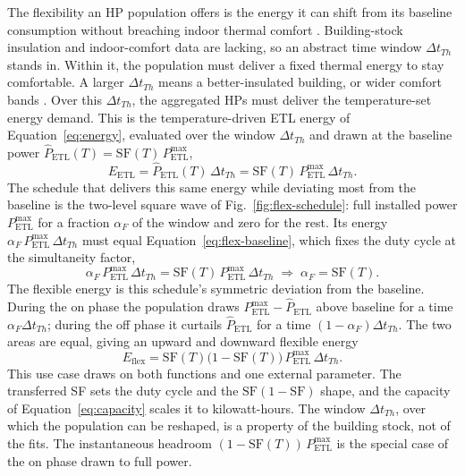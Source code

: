 \documentclass[9pt,journal,a4]{IEEEtran}
\begin{document}
The flexibility an HP population offers is the energy it can shift from its baseline consumption without breaching indoor thermal comfort \cite{Zir19}. Building-stock insulation and indoor-comfort data are lacking, so an abstract time window $\Delta t_{Th}$ stands in. Within it, the population must deliver a fixed thermal energy to stay comfortable. A larger $\Delta t_{Th}$ means a better-insulated building, or wider comfort bands \cite{Cha16}.
Over this $\Delta t_{Th}$, the aggregated HPs must deliver the temperature-set energy demand. This is the temperature-driven ETL energy of Equation~\eqref{eq:energy}, evaluated over the window $\Delta t_{Th}$ and drawn at the baseline power $\hat{P}_{\mathrm{ETL}}(T) = \mathrm{SF}(T)\,P_{\mathrm{ETL}}^{\max}$,
\begin{equation}
E_{\mathrm{ETL}} = \hat{P}_{\mathrm{ETL}}(T)\,\Delta t_{Th} = \mathrm{SF}(T)\,P_{\mathrm{ETL}}^{\max}\,\Delta t_{Th}.
\label{eq:flex-baseline}
\end{equation}
The schedule that delivers this same energy while deviating most from the baseline is the two-level square wave of Fig.~\ref{fig:flex-schedule}: full installed power $P_{\mathrm{ETL}}^{\max}$ for a fraction $\alpha_F$ of the window and zero for the rest. Its energy $\alpha_F\,P_{\mathrm{ETL}}^{\max}\,\Delta t_{Th}$ must equal Equation~\eqref{eq:flex-baseline}, which fixes the duty cycle at the simultaneity factor,
\begin{equation}
\alpha_F\,P_{\mathrm{ETL}}^{\max}\,\Delta t_{Th} = \mathrm{SF}(T)\,P_{\mathrm{ETL}}^{\max}\,\Delta t_{Th} \;\Longrightarrow\; \alpha_F = \mathrm{SF}(T).
\label{eq:flex-duty}
\end{equation}
The flexible energy is this schedule's symmetric deviation from the baseline. During the on phase the population draws $P_{\mathrm{ETL}}^{\max} - \hat{P}_{\mathrm{ETL}}$ above baseline for a time $\alpha_F \Delta t_{Th}$; during the off phase it curtails $\hat{P}_{\mathrm{ETL}}$ for a time $(1 - \alpha_F)\Delta t_{Th}$. The two areas are equal, giving an upward and downward flexible energy
\begin{equation}
E_{\mathrm{flex}} = \mathrm{SF}(T)\big(1 - \mathrm{SF}(T)\big)\,P_{\mathrm{ETL}}^{\max}\,\Delta t_{Th}.
\label{eq:flex-energy}
\end{equation}
This use case draws on both functions and one external parameter. The transferred SF sets the duty cycle and the $\mathrm{SF}(1-\mathrm{SF})$ shape, and the capacity of Equation~\eqref{eq:capacity} scales it to kilowatt-hours. The window $\Delta t_{Th}$, over which the population can be reshaped, is a property of the building stock, not of the fits. The instantaneous headroom $(1 - \mathrm{SF}(T))\,P_{\mathrm{ETL}}^{\max}$ is the special case of the on phase drawn to full power.
\end{document}
